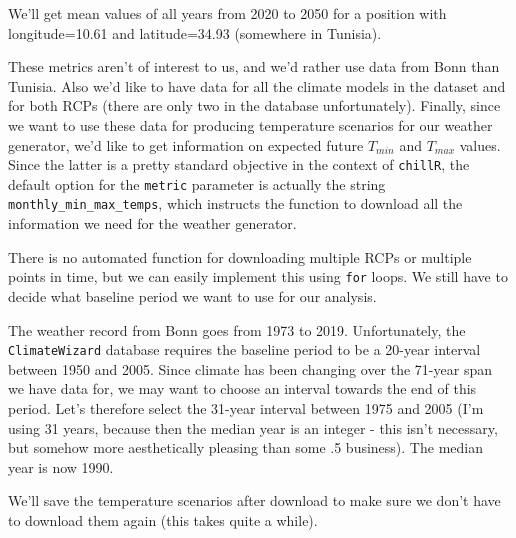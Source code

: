 \documentclass[
]{book}
\begin{document}
We'll get mean values of all years from 2020 to 2050 for a position with longitude=10.61 and latitude=34.93 (somewhere in Tunisia).

These metrics aren't of interest to us, and we'd rather use data from Bonn than Tunisia. Also we'd like to have data for all the climate models in the dataset and for both RCPs (there are only two in the database unfortunately). Finally, since we want to use these data for producing temperature scenarios for our weather generator, we'd like to get information on expected future \(T_{min}\) and \(T_{max}\) values. Since the latter is a pretty standard objective in the context of \texttt{chillR}, the default option for the \texttt{metric} parameter is actually the string \texttt{monthly\_min\_max\_temps}, which instructs the function to download all the information we need for the weather generator.

There is no automated function for downloading multiple RCPs or multiple points in time, but we can easily implement this using \texttt{for} loops. We still have to decide what baseline period we want to use for our analysis.

The weather record from Bonn goes from 1973 to 2019. Unfortunately, the \texttt{ClimateWizard} database requires the baseline period to be a 20-year interval between 1950 and 2005. Since climate has been changing over the 71-year span we have data for, we may want to choose an interval towards the end of this period. Let's therefore select the 31-year interval between 1975 and 2005 (I'm using 31 years, because then the median year is an integer - this isn't necessary, but somehow more aesthetically pleasing than some .5 business). The median year is now 1990.

We'll save the temperature scenarios after download to make sure we don't have to download them again (this takes quite a while).
\end{document}
